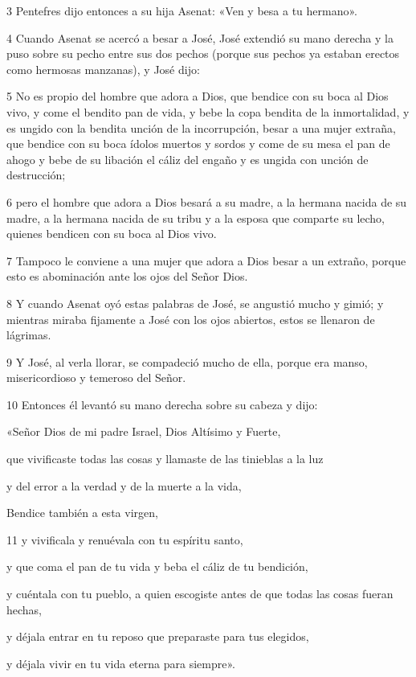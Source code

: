 \par 3 Pentefres dijo entonces a su hija Asenat: «Ven y besa a tu hermano».

\par 4 Cuando Asenat se acercó a besar a José, José extendió su mano derecha y la puso sobre su pecho entre sus dos pechos (porque sus pechos ya estaban erectos como hermosas manzanas), y José dijo:

\par 5 No es propio del hombre que adora a Dios, que bendice con su boca al Dios vivo, y come el bendito pan de vida, y bebe la copa bendita de la inmortalidad, y es ungido con la bendita unción de la incorrupción, besar a una mujer extraña, que bendice con su boca ídolos muertos y sordos y come de su mesa el pan de ahogo y bebe de su libación el cáliz del engaño y es ungida con unción de destrucción;

\par 6 pero el hombre que adora a Dios besará a su madre, a la hermana nacida de su madre, a la hermana nacida de su tribu y a la esposa que comparte su lecho, quienes bendicen con su boca al Dios vivo.

\par 7 Tampoco le conviene a una mujer que adora a Dios besar a un extraño, porque esto es abominación ante los ojos del Señor Dios.

\par 8 Y cuando Asenat oyó estas palabras de José, se angustió mucho y gimió; y mientras miraba fijamente a José con los ojos abiertos, estos se llenaron de lágrimas.

\par 9 Y José, al verla llorar, se compadeció mucho de ella, porque era manso, misericordioso y temeroso del Señor.

\par 10 Entonces él levantó su mano derecha sobre su cabeza y dijo:

\par «Señor Dios de mi padre Israel, Dios Altísimo y Fuerte,
\par que vivificaste todas las cosas y llamaste de las tinieblas a la luz
\par y del error a la verdad y de la muerte a la vida,
\par Bendice también a esta virgen,

\par 11 y vivificala y renuévala con tu espíritu santo,
\par y que coma el pan de tu vida y beba el cáliz de tu bendición,
\par y cuéntala con tu pueblo, a quien escogiste antes de que todas las cosas fueran hechas,
\par y déjala entrar en tu reposo que preparaste para tus elegidos,
\par y déjala vivir en tu vida eterna para siempre».

